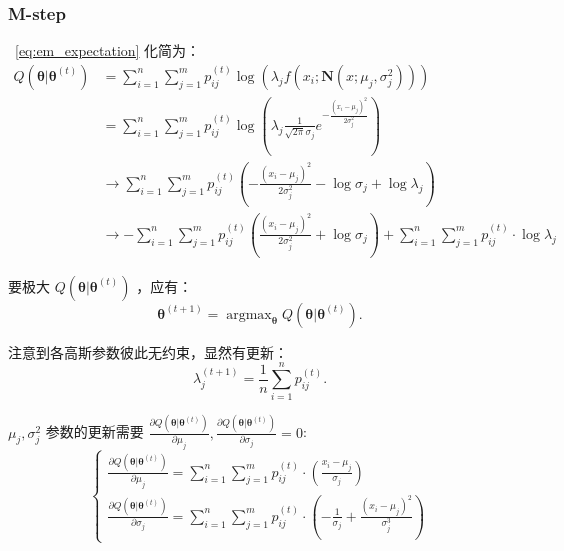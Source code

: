 \subsubsection{M-step}\label{sec:m-step}
~\eqref{eq:em_expectation} 化简为：
\begin{equation}
    \begin{aligned}
        Q(\boldsymbol{\theta}|\boldsymbol{\theta}^{(t)})
        &=\sum_{i=1}^n\sum_{j=1}^mp_{ij}^{(t)}\log\left(\lambda_jf(x_i;\mathbf{N}
        (x;\mu_j, \sigma_j^2))\right)\\
        &=\sum_{i=1}^n\sum_{j=1}^mp_{ij}^{(t)}\log\left(
        \lambda_{j}\frac{1}{\sqrt{2\pi}\sigma_j}e^{-\frac{(x_i-\mu_{j})^2}{2\sigma_j^2}}\right)\\
        &\rightarrow\sum_{i=1}^n\sum_{j=1}^mp_{ij}^{(t)}\left(
        {-\frac{(x_i-\mu_{j})^2}{2\sigma_j^2}}-\log{\sigma_j}+\log{\lambda_j}\right)\\
        &\rightarrow-\sum_{i=1}^n\sum_{j=1}^mp_{ij}^{(t)}\left(
        {\frac{(x_i-\mu_{j})^2}{2\sigma_j^2}}+\log{\sigma_j}\right)
        +\sum_{i=1}^n\sum_{j=1}^mp_{ij}^{(t)}\cdot\log{\lambda_j}
    \end{aligned}
\end{equation}

要极大 $Q(\boldsymbol{\theta}|\boldsymbol{\theta}^{(t)})$ ，应有：
\begin{equation}
    \boldsymbol{\theta}^{(t+1)}=\operatorname{argmax}_{\boldsymbol{\theta}}Q(\boldsymbol{\theta}|\boldsymbol{\theta}^{(t)}).
\end{equation}

注意到各高斯参数彼此无约束，显然有更新：
\begin{equation}
    \label{eq:update-lambda}
    \lambda_j^{(t+1)}=\frac1n\sum_{i=1}^np_{ij}^{(t)}.
\end{equation}

$\mu_j,\sigma_j^2$ 参数的更新需要
$\frac{\partial Q(\boldsymbol{\theta}|\boldsymbol{\theta}^{(t)})}{\partial \mu_j}, 
\frac{\partial Q(\boldsymbol{\theta}|\boldsymbol{\theta}^{(t)})}{\partial \sigma_j} = 0$:
\begin{equation}
    \label{eq:freeq}
    \begin{cases}
        \frac{\partial Q(\boldsymbol{\theta}|\boldsymbol{\theta}^{(t)})}{\partial \mu_j}
        =\sum_{i=1}^n\sum_{j=1}^mp_{ij}^{(t)}\cdot\left(\frac{x_i-\mu_j}{\sigma_j}\right) \\
        \frac{\partial Q(\boldsymbol{\theta}|\boldsymbol{\theta}^{(t)})}{\partial \sigma_j}
        =\sum_{i=1}^n\sum_{j=1}^mp_{ij}^{(t)}\cdot\left(-\frac{1}{\sigma_j}+
        \frac{(x_i-\mu_j)^2}{\sigma_j^3}\right)
    \end{cases}
\end{equation}

